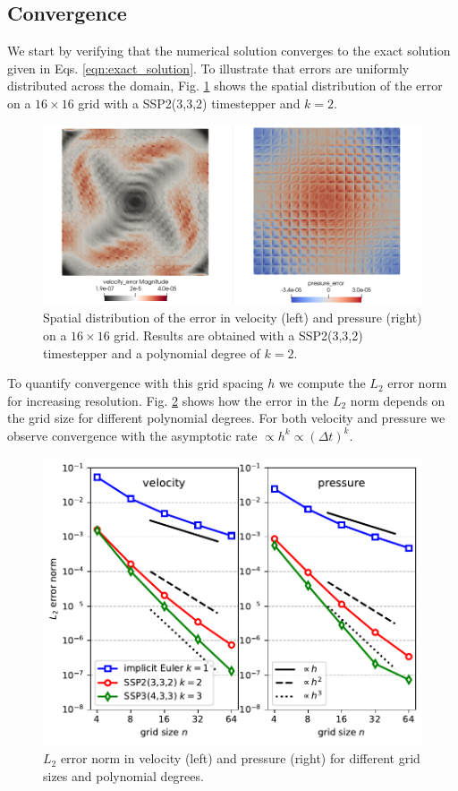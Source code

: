 \documentclass[11pt]{article}
\begin{document}
\subsection{Convergence}
We start by verifying that the numerical solution converges to the exact solution given in Eqs. \eqref{eqn:exact_solution}. To illustrate that errors are uniformly distributed across the domain, Fig. \ref{fig:spatial_error} shows the spatial distribution of the error on a $16\times 16$ grid with a SSP2(3,3,2) timestepper and $k=2$.
\begin{figure}
    \begin{center}
        \includegraphics[width=1.0\linewidth]{figures/error_spatial.png}
        \caption{Spatial distribution of the error in velocity (left) and pressure (right) on a $16\times 16$ grid. Results are obtained with a SSP2(3,3,2) timestepper and a polynomial degree of $k=2$.}
        \label{fig:spatial_error}
    \end{center}
\end{figure}
To quantify convergence with this grid spacing $h$ we compute the $L_2$ error norm for increasing resolution. Fig. \ref{fig:L2error} shows how the error in the $L_2$ norm depends on the grid size for different polynomial degrees. For both velocity and pressure we observe convergence with the asymptotic rate  $\propto h^{k}\propto (\Delta t)^k$.
\begin{figure}
    \begin{center}
        \includegraphics[width=0.75\linewidth]{figures/L2error.pdf}
        \caption{$L_2$ error norm in velocity (left) and pressure (right) for different grid sizes and polynomial degrees.}
        \label{fig:L2error}
    \end{center}
\end{figure}
\end{document}
